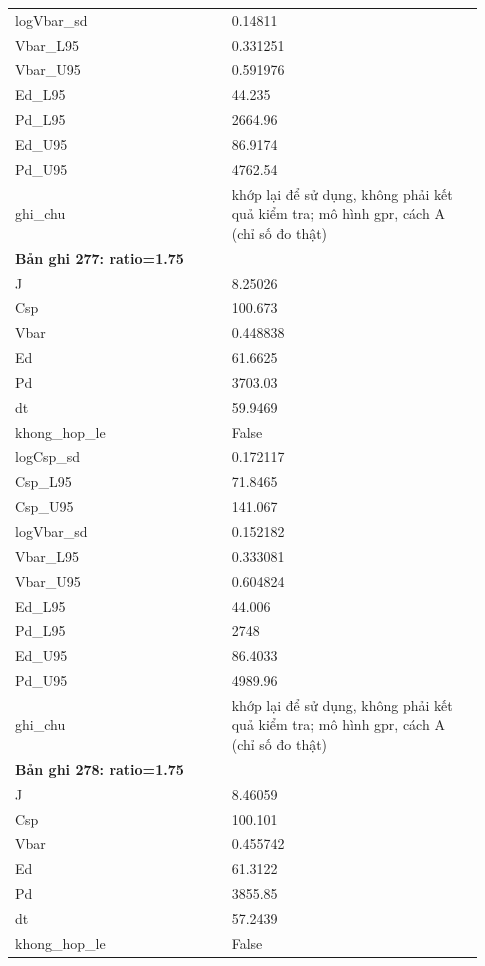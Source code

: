 \begin{longtable}{p{0.43\linewidth}p{0.50\linewidth}}
logVbar\_\allowbreak sd & 0.14811 \\
Vbar\_\allowbreak L95 & 0.331251 \\
Vbar\_\allowbreak U95 & 0.591976 \\
Ed\_\allowbreak L95 & 44.235 \\
Pd\_\allowbreak L95 & 2664.96 \\
Ed\_\allowbreak U95 & 86.9174 \\
Pd\_\allowbreak U95 & 4762.54 \\
ghi\_\allowbreak chu & khớp lại để sử dụng, không phải kết quả kiểm tra; mô hình gpr, cách A (chỉ số đo thật) \\
\midrule
\multicolumn{2}{p{0.95\linewidth}}{\textbf{Bản ghi 277: ratio=1.75}} \\
J & 8.25026 \\
Csp & 100.673 \\
Vbar & 0.448838 \\
Ed & 61.6625 \\
Pd & 3703.03 \\
dt & 59.9469 \\
khong\_\allowbreak hop\_\allowbreak le & False \\
logCsp\_\allowbreak sd & 0.172117 \\
Csp\_\allowbreak L95 & 71.8465 \\
Csp\_\allowbreak U95 & 141.067 \\
logVbar\_\allowbreak sd & 0.152182 \\
Vbar\_\allowbreak L95 & 0.333081 \\
Vbar\_\allowbreak U95 & 0.604824 \\
Ed\_\allowbreak L95 & 44.006 \\
Pd\_\allowbreak L95 & 2748 \\
Ed\_\allowbreak U95 & 86.4033 \\
Pd\_\allowbreak U95 & 4989.96 \\
ghi\_\allowbreak chu & khớp lại để sử dụng, không phải kết quả kiểm tra; mô hình gpr, cách A (chỉ số đo thật) \\
\midrule
\multicolumn{2}{p{0.95\linewidth}}{\textbf{Bản ghi 278: ratio=1.75}} \\
J & 8.46059 \\
Csp & 100.101 \\
Vbar & 0.455742 \\
Ed & 61.3122 \\
Pd & 3855.85 \\
dt & 57.2439 \\
khong\_\allowbreak hop\_\allowbreak le & False \\

\end{longtable}
